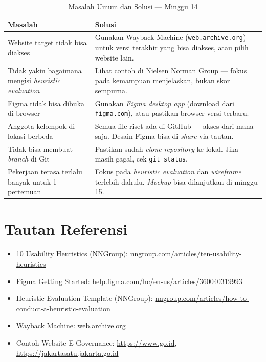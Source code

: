\begin{table}[htbp]
\centering
\caption{Masalah Umum dan Solusi --- Minggu 14}
\label{tab:troubleshooting-14}
\small
\begin{tabular}{@{}p{5.5cm}p{8cm}@{}}
\toprule
\textbf{Masalah} & \textbf{Solusi} \\
\midrule
Website target tidak bisa diakses & Gunakan Wayback Machine (\texttt{web.archive.org}) untuk versi terakhir yang bisa diakses, atau pilih website lain. \\
Tidak yakin bagaimana mengisi \emph{heuristic evaluation} & Lihat contoh di Nielsen Norman Group --- fokus pada kemampuan menjelaskan, bukan skor sempurna. \\
Figma tidak bisa dibuka di browser & Gunakan \emph{Figma desktop app} (download dari \texttt{figma.com}), atau pastikan browser versi terbaru. \\
Anggota kelompok di lokasi berbeda & Semua file riset ada di GitHub --- akses dari mana saja. Desain Figma bisa di-\emph{share} via tautan. \\
Tidak bisa membuat \emph{branch} di Git & Pastikan sudah \emph{clone} \emph{repository} ke lokal. Jika masih gagal, cek \texttt{git status}. \\
Pekerjaan terasa terlalu banyak untuk 1 pertemuan & Fokus pada \emph{heuristic evaluation} dan \emph{wireframe} terlebih dahulu. \emph{Mockup} bisa dilanjutkan di minggu 15. \\
\bottomrule
\end{tabular}
\end{table}

\section{Tautan Referensi}
\label{sec:referensi-minggu-14}

\begin{itemize}
  \item 10 Usability Heuristics (NNGroup): \href{https://www.nngroup.com/articles/ten-usability-heuristics/}{nngroup.com/articles/ten-usability-heuristics}
  \item Figma Getting Started: \href{https://help.figma.com/hc/en-us/articles/360040319993}{help.figma.com/hc/en-us/articles/360040319993}
  \item Heuristic Evaluation Template (NNGroup): \href{https://www.nngroup.com/articles/how-to-conduct-a-heuristic-evaluation/}{nngroup.com/articles/how-to-conduct-a-heuristic-evaluation}
  \item Wayback Machine: \href{https://web.archive.org}{web.archive.org}
  \item Contoh Website E-Governance: \url{https://www.go.id}, \url{https://jakartasatu.jakarta.go.id}
\end{itemize}

